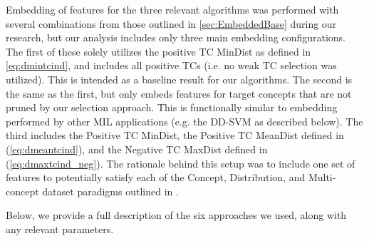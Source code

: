 \documentclass[12pt,dvips]{report}
\numberwithin{equation}{section}
\begin{document}
Embedding of features for the three relevant algorithms was performed with several combinations from those outlined in \ref{sec:EmbeddedBase} during our research, but our analysis includes only three main embedding configurations.  The first of these solely utilizes the positive TC MinDist as defined in \ref{eq:dmintcind}, and includes all positive TCs (i.e. no weak TC selection was utilized).  This  is intended as a baseline result for our algorithms.  The second is the same as the first, but only embeds features for target concepts that are not pruned by our selection approach.  This is functionally similar to embedding performed by other MIL applications (e.g. the DD-SVM as described below).  The third includes the Positive TC MinDist, the Positive TC MeanDist defined in (\ref{eq:dmeantcind}), and the Negative TC MaxDist defined in (\ref{eq:dmaxtcind_neg}).  The rationale behind this setup was to include one set of features to potentially satisfy each of the Concept, Distribution, and Multi-concept dataset paradigms outlined in \cite{chap14}.  

 Below, we provide a full description of the six approaches we used, along with any relevant parameters.
\end{document}
